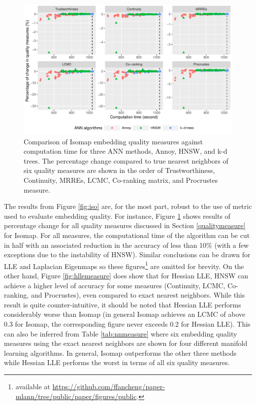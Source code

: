 \documentclass[11pt,a4paper,]{article}
\begin{document}
\begin{figure}

{\centering \includegraphics[width=1\linewidth]{mlann_ebs_files/figure-latex/iso6measure-1} 

}

\caption{Comparison of Isomap embedding quality measures against computation time for three ANN methods, Annoy, HNSW, and k-d trees. The percentage change compared to true nearest neighbors of six quality measures are shown in the order of Trustworthiness, Continuity, MRREs, LCMC, Co-ranking matrix, and Procrustes measure. }\label{fig:iso6measure}
\end{figure}

The results from Figure \ref{fig:iso} are, for the most part, robust to the use of metric used to evaluate embedding quality. For instance, Figure \ref{fig:iso6measure} shows results of percentage change for all quality measures discussed in Section \ref{qualitymeasure} for Isomap. For all measures, the computational time of the algorithm can be cut in half with an associated reduction in the accuracy of less than 10\% (with a few exceptions due to the instability of HNSW). Similar conclusions can be drawn for LLE and Laplacian Eigenmaps so these figures\footnote{available at \url{https://github.com/ffancheng/paper-mlann/tree/public/paper/figures/public}.} are omitted for brevity.
On the other hand, Figure \ref{fig:hllemeasure} does show that for Hessian LLE, HNSW can achieve a higher level of accuracy for some measures (Continuity, LCMC, Co-ranking, and Procrustes), even compared to exact nearest neighbors. While this result is quite counter-intuitive, it should be noted that Hessian LLE performs considerably worse than Isomap (in general Isomap achieves an LCMC of above 0.3 for Isomap, the corresponding figure never exceeds 0.2 for Hessian LLE).
This can also be inferred from Table \ref{tab:nnmeasure} where six embedding quality measures using the exact nearest neighbors are shown for four different manifold learning algorithms. In general, Isomap outperforms the other three methods while Hessian LLE performs the worst in terms of all six quality measures.
\end{document}
